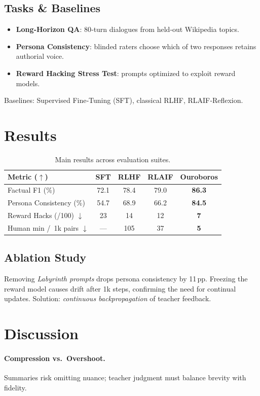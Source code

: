 \documentclass[11pt]{article}
\begin{document}
\subsection{Tasks \& Baselines}
\begin{itemize}
    \item \textbf{Long‑Horizon QA}: 80‑turn dialogues from held‑out Wikipedia topics.
    \item \textbf{Persona Consistency}: blinded raters choose which of two responses retains authorial voice.
    \item \textbf{Reward Hacking Stress Test}: prompts optimized to exploit reward models.
\end{itemize}
Baselines: Supervised Fine‑Tuning (SFT), classical RLHF, RLAIF‑Reflexion.

\section{Results}
\begin{table}[h]
\centering
\begin{tabular}{lcccc}
\toprule
\textbf{Metric} ($\uparrow$) & \textbf{SFT} & \textbf{RLHF} & \textbf{RLAIF} & \textbf{Ouroboros}\\
\midrule
Factual F1 (\%)    & 72.1 & 78.4 & 79.0 & \textbf{86.3}\\
Persona Consistency (\%) & 54.7 & 68.9 & 66.2 & \textbf{84.5}\\
Reward Hacks (/100) $\downarrow$ & 23 & 14 & 12 & \textbf{7}\\
Human min / 1k pairs $\downarrow$ & --- & 105 & 37 & \textbf{5}\\
\bottomrule
\end{tabular}
\caption{Main results across evaluation suites.}
\label{tab:results}
\end{table}

\subsection{Ablation Study}
Removing \emph{Labyrinth prompts} drops persona consistency by 11 pp. Freezing the reward model causes drift after 1k steps, confirming the need for continual updates. Solution: \emph{continuous backpropagation} of teacher feedback.

\section{Discussion}
\paragraph{Compression vs.\ Overshoot.} Summaries risk omitting nuance; teacher judgment must balance brevity with fidelity.%
\end{document}
